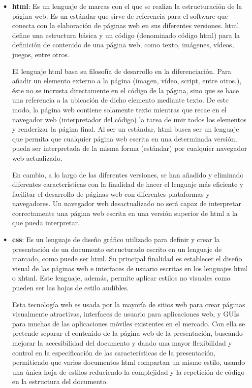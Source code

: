 \begin{itemize}
\item \textbf{\acrshort{html}}: Es un lenguaje de marcas con el que se realiza la estructuración de la página web. Es un estándar que sirve de referencia para el \gls{software} que conecta con la elaboración de páginas web en sus diferentes versiones. \acrshort{html} define una estructura básica y un código (denominado código \acrshort{html}) para la definición de contenido de una página web, como texto, imágenes, vídeos, juegos, entre otros. 

El lenguaje \acrshort{html} basa su filosofía de desarrollo en la diferenciación. Para añadir un elemento externo a la página (imagen, vídeo, script, entre otros.), éste no se incrusta directamente en el código de la página, sino que se hace una referencia a la ubicación de dicho elemento mediante texto. De este modo, la página web contiene solamente texto mientras que recae en el navegador web (interpretador del código) la tarea de unir todos los elementos y renderizar la página final. Al ser un estándar, \acrshort{html} busca ser un lenguaje que permita que cualquier página web escrita en una determinada versión, pueda ser interpretada de la misma forma (estándar) por cualquier navegador web actualizado.

En cambio, a lo largo de las diferentes versiones, se han añadido y eliminado diferentes características con la finalidad de hacer el lenguaje más eficiente y facilitar el desarrollo de páginas web con diferentes plataformas y navegadores. Un navegador web  desactualizado no será capaz de interpretar correctamente una página web escrita en una versión superior de \acrshort{html} a la que pueda interpretar.  

\item \textbf{\acrshort{css}}: Es un lenguaje de diseño gráfico utilizado para definir y crear la presentación de un documento estructurado escrito en un lenguaje de marcado, como puede ser \acrshort{html}. Su principal finalidad es establecer el diseño visual de las páginas web e interfaces de usuario escritas en los lenguajes \acrshort{html} o \acrfull{xhtml}. Este lenguaje, además, permite aplicar estilos no visuales como pueden ser las hojas de estilo audibles.

Esta tecnología web es usada por la mayoría de sitios web para crear páginas visualmente atractivas, interfaces de usuario para aplicaciones web, y GUIs para muchas de las aplicaciones móviles existentes en el mercado. Con ella se pretende separar el contenido de la página web de la presentación, buscando mejorar la accesibilidad del documento y dando una mayor flexibilidad y control en la especificación de las características de la presentación, permitiendo que varios documentos \acrshort{html} compartan un mismo estilo, usando una única hoja de estilos reduciendo la complejidad y la repetición de código en la estructura del documento.


\end{itemize}
